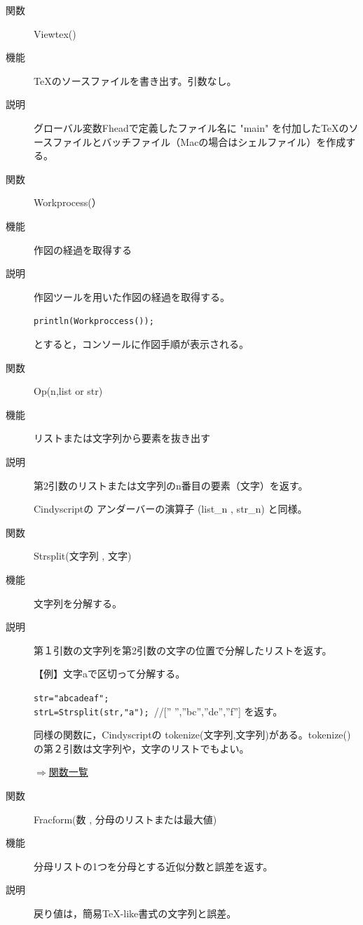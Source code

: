 \documentclass[papersize,a4paper,12pt,uplatex]{jsarticle}
\begin{document}
\begin{description}
\vspace{\baselineskip}
\hypertarget{viewtex}{}
\item[関数]Viewtex()
\item[機能]\TeX のソースファイルを書き出す。引数なし。
\item[説明]グローバル変数Fheadで定義したファイル名に "main" を付加した\TeX のソースファイルとバッチファイル（Macの場合はシェルファイル）を作成する。
 
\vspace{\baselineskip}
\hypertarget{workprocess}{}
\item[関数]Workprocess(）
\item[機能]作図の経過を取得する
\item[説明]作図ツールを用いた作図の経過を取得する。

\verb|println(Workproccess());|

とすると，コンソールに作図手順が表示される。

\vspace{\baselineskip}
\hypertarget{op}{}
\item[関数]Op(n,list or str)
\item[機能]リストまたは文字列から要素を抜き出す
\item[説明]第2引数のリストまたは文字列のn番目の要素（文字）を返す。

Cindyscriptの アンダーバーの演算子 (list\_n , str\_n) と同様。

\vspace{\baselineskip}
\hypertarget{strsplit}{}
\item[関数]Strsplit(文字列 , 文字)
\item[機能]文字列を分解する。
\item[説明]第１引数の文字列を第2引数の文字の位置で分解したリストを返す。

\vspace{\baselineskip}
【例】文字aで区切って分解する。

\verb|str="abcadeaf";| \\
\verb|strL=Strsplit(str,"a"); |//[” ”,”bc”,”de”,”f”] を返す。

同様の関数に，Cindyscriptの tokenize(文字列,文字列)がある。tokenize() の第２引数は文字列や，文字のリストでもよい。

\begin{flushright}\hyperlink{functionlist}{$\Rightarrow$関数一覧}\end{flushright}

\vspace{\baselineskip}
\hypertarget{fracform}{}
\item[関数]Fracform(数 , 分母のリストまたは最大値)
\item[機能]分母リストの1つを分母とする近似分数と誤差を返す。
\item[説明]戻り値は，簡易TeX-like書式の文字列と誤差。


\end{description}
\end{document}

